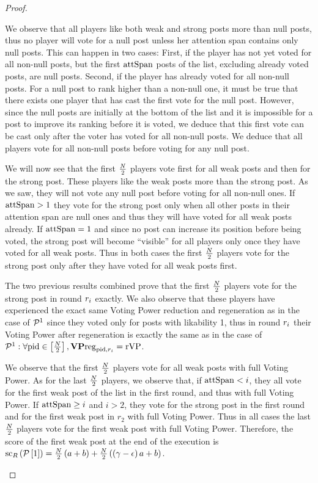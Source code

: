 \begin{proof}
\begin{itemize}
    We observe that all players like both weak and strong posts more than null
    posts, thus no player will vote for a null post unless her attention span
    contains only null posts. This can happen in two cases: First, if the player
    has not yet voted for all non-null posts, but the first $\mathrm{attSpan}$ posts of
    the list, excluding already voted posts, are null posts. Second, if the
    player has already voted for all non-null posts. For a null post to rank
    higher than a non-null one, it must be true that there exists one player
    that has cast the first vote for the null post. However, since the null
    posts are initially at the bottom of the list and it is impossible for a
    post to improve its ranking before it is voted, we deduce that this first
    vote can be cast only after the voter has voted for all non-null posts. We
    deduce that all players vote for all non-null posts before voting for any
    null post.

    We will now see that the first $\frac{N}{2}$ players vote first for
    all weak posts and then for the strong post. These players like the weak
    posts more than the strong post. As we saw, they will not vote any null
    post before voting for all non-null ones. If $\mathrm{attSpan} > 1$ they vote for
    the strong post only when all other posts in their attention span are null
    ones and thus they will have voted for all weak posts already. If $\mathrm{attSpan}
    = 1$ and since no post can increase its position before being voted, the
    strong post will become ``visible'' for all players only once they have
    voted for all weak posts. Thus in both cases the first
    $\frac{N}{2}$ players vote for the strong post only after they have
    voted for all weak posts first.

    The two previous results combined prove that the first
    $\frac{N}{2}$ players vote for the strong post in round $r_i$
    exactly. We also observe that these players have experienced the exact same
    Voting Power reduction and regeneration as in the case of $\mathcal{P}^1$
    since they voted only for posts with likability 1, thus in round $r_i$
    their Voting Power after regeneration is exactly the same as in the case of
    $\mathcal{P}^1: \forall \mathrm{pid} \in \left[\frac{N}{2}\right],
    \mathrm{\textbf{VP}reg}_{\mathrm{pid}, r_i} = \mathrm{rVP}$.

    We observe that the first $\frac{N}{2}$ players vote for all weak
    posts with full Voting Power. As for the last $\frac{N}{2}$
    players, we observe that, if $\mathrm{attSpan} < i$, they all vote for the first
    weak post of the list in the first round, and thus with full Voting Power. If
    $\mathrm{attSpan} \geq i$ and $i > 2$, they vote for the strong post in the first
    round and for the first weak post in $r_2$ with full Voting Power. Thus in
    all cases the last $\frac{N}{2}$ players vote for the first weak
    post with full Voting Power. Therefore, the score of the first weak post at
    the end of the execution is
    $\mathrm{sc}_{R}\left(\mathcal{P}\left[1\right]\right) =
    \frac{N}{2}\left(a + b\right) +
    \frac{N}{2}\left(\left(\gamma - \epsilon\right) a + b\right)$.


\end{itemize}
\end{proof}
